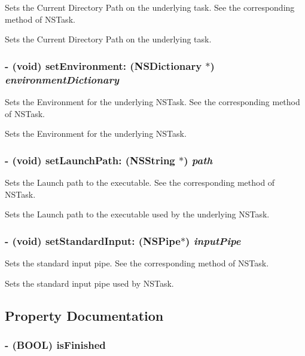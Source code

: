 Sets the Current Directory Path on the underlying task. See the corresponding method of NSTask. 

Sets the Current Directory Path on the underlying task. \hypertarget{interface_m_f_task_72f01cdfaa5ba8761774154cf6ad1781}{
\subsubsection[{setEnvironment:}]{\setlength{\rightskip}{0pt plus 5cm}- (void) setEnvironment: (NSDictionary $\ast$) {\em environmentDictionary}}}
\label{interface_m_f_task_72f01cdfaa5ba8761774154cf6ad1781}


Sets the Environment for the underlying NSTask. See the corresponding method of NSTask. 

Sets the Environment for the underlying NSTask. \hypertarget{interface_m_f_task_770333b9990b65b2565314ee7ddf380e}{
\subsubsection[{setLaunchPath:}]{\setlength{\rightskip}{0pt plus 5cm}- (void) setLaunchPath: (NSString $\ast$) {\em path}}}
\label{interface_m_f_task_770333b9990b65b2565314ee7ddf380e}


Sets the Launch path to the executable. See the corresponding method of NSTask. 

Sets the Launch path to the executable used by the underlying NSTask. \hypertarget{interface_m_f_task_dee902a3552d91fec48c1edda0486180}{
\subsubsection[{setStandardInput:}]{\setlength{\rightskip}{0pt plus 5cm}- (void) setStandardInput: (NSPipe$\ast$) {\em inputPipe}}}
\label{interface_m_f_task_dee902a3552d91fec48c1edda0486180}


Sets the standard input pipe. See the corresponding method of NSTask. 

Sets the standard input pipe used by NSTask. 

\subsection{Property Documentation}
\hypertarget{interface_m_f_task_ff8a9424833ed515702b622592f6869f}{
\subsubsection[{isFinished}]{\setlength{\rightskip}{0pt plus 5cm}- (BOOL) isFinished}}
\label{interface_m_f_task_ff8a9424833ed515702b622592f6869f}


